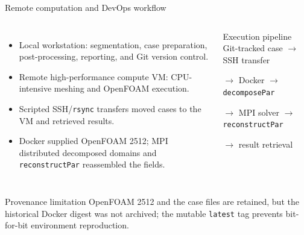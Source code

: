 \documentclass[aspectratio=169,11pt]{beamer}
\begin{document}
\begin{frame}{Remote computation and DevOps workflow}
  \small
  \begin{columns}[T,onlytextwidth]
      \begin{itemize}
        \item Local workstation: segmentation, case preparation, post-processing, reporting, and Git version control.
        \item Remote high-performance compute VM: CPU-intensive meshing and OpenFOAM execution.
        \item Scripted SSH/\texttt{rsync} transfers moved cases to the VM and retrieved results.
        \item Docker supplied OpenFOAM 2512; MPI distributed decomposed domains and \texttt{reconstructPar} reassembled the fields.
      \end{itemize}
      \begin{block}{Execution pipeline}
        Git-tracked case $\rightarrow$ SSH transfer

        $\rightarrow$ Docker $\rightarrow$ \texttt{decomposePar}

        $\rightarrow$ MPI solver $\rightarrow$ \texttt{reconstructPar}

        $\rightarrow$ result retrieval
      \end{block}
  \end{columns}
  \begin{alertblock}{Provenance limitation}
    \scriptsize OpenFOAM 2512 and the case files are retained, but the historical Docker digest was not archived; the mutable \texttt{latest} tag prevents bit-for-bit environment reproduction.
  \end{alertblock}
\end{frame}
\end{document}
